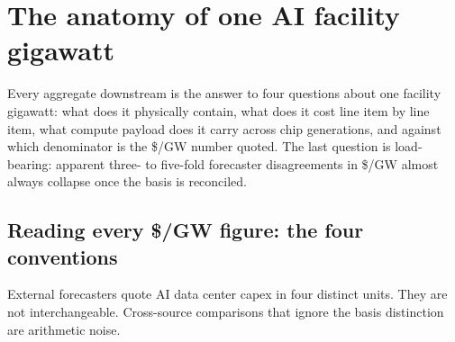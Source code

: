 \documentclass[11pt,a4paper]{article}
\begin{document}
\section{The anatomy of one AI facility gigawatt}
\label{sec:anatomy}

Every aggregate downstream is the answer to four questions about one facility gigawatt: what does it physically contain, what does it cost line item by line item, what compute payload does it carry across chip generations, and against which denominator is the \$/GW number quoted. The last question is load-bearing: apparent three- to five-fold forecaster disagreements in \$/GW almost always collapse once the basis is reconciled.

\subsection{Reading every \$/GW figure: the four conventions}
\label{subsec:basis-conventions}

External forecasters quote AI data center capex in four distinct units. They are not interchangeable. Cross-source comparisons that ignore the basis distinction are arithmetic noise.
\end{document}
